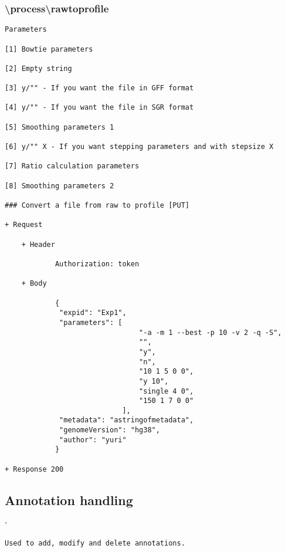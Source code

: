 \subsubsection*{\textbackslash process\textbackslash rawtoprofile}
\begin{verbatim}
Parameters

[1] Bowtie parameters

[2] Empty string

[3] y/"" - If you want the file in GFF format

[4] y/"" - If you want the file in SGR format

[5] Smoothing parameters 1

[6] y/"" X - If you want stepping parameters and with stepsize X

[7] Ratio calculation parameters

[8] Smoothing parameters 2

### Convert a file from raw to profile [PUT]

+ Request 

    + Header
    
            Authorization: token
            
    + Body
            
            {
             "expid": "Exp1",
             "parameters": [
                                "-a -m 1 --best -p 10 -v 2 -q -S", 
                                "",
                                "y",
                                "n",
                                "10 1 5 0 0",
                                "y 10",
                                "single 4 0",
                                "150 1 7 0 0"
                            ],
             "metadata": "astringofmetadata",
             "genomeVersion": "hg38",
             "author": "yuri"
            }
            
+ Response 200
\end{verbatim}

\subsection*{Annotation handling}'
\begin{verbatim}
Used to add, modify and delete annotations.
\end{verbatim}
